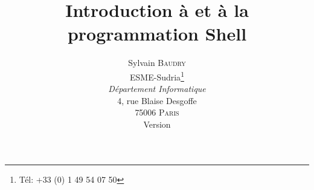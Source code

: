 \documentclass[titlepage,twoside,a4paper]{book}
\title{
	Introduction {\`a} {\Unix} et {\`a} la programmation Shell
}
\author{
	Sylvain \textsc{Baudry}\\[3ex]
	ESME-Sudria\thanks{T{\'e}l: +33 (0) 1 49 54 07 50}\\
	\textsl{D{\'e}partement Informatique}\\
	4, rue Blaise Desgoffe\\
	75006 \textsc{Paris}\\[3ex]
	Version \docversion
}
\date{\docdate}
\newcounter{remarque-cnt}
\newcounter{example-cnt}
\begin{document}
\newenvironment{example}{
	\begin{sloppypar}
	\noindent
	\textbf{Exemple~{\thechapter}.\arabic{example-cnt}~:}\\
	\hspace*{\fill} \linebreak \vspace{-7ex}
	\begin{quote}
}
{	\end{quote}
	\stepcounter{example-cnt}
	\end{sloppypar}
}

\newenvironment{remarque}{
	\begin{sloppypar}
	\noindent
	\textbf{Remarque~{\thechapter}.\arabic{remarque-cnt}~:}\\
	\hspace*{\fill} \linebreak \vspace{-7ex}
	\begin{quote}\it
}
{	
	\end{quote}
	\stepcounter{remarque-cnt}
	\end{sloppypar}
}

\newenvironment{definition}[1]{
	\begin{sloppypar}
	\noindent
	\textbf{#1~:}\\
	\hspace*{\fill} \linebreak \vspace{-7ex}
	\begin{quote}
}
{	\end{quote}
	\end{sloppypar}
}


\maketitle						%

\frontmatter

\lhead[Pr{\'e}face]{}
\chead{}

\clearpage						%
\newpage
\lhead[\contentsname]{}
\chead{}
\rhead[]{\contentsname}
\end{document}

